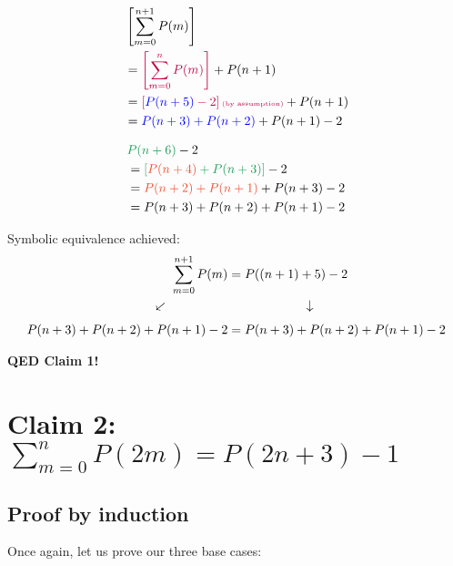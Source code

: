 \documentclass[11pt]{article}
\begin{document}
\begin{table}[h]
   \begin{subtable}[t]{0.45\textwidth}
      \begin{alignat*}{2}
         &\left[\sum_{m=0}^{n+1} P(m)\right] \\
         &=\textcolor{purple}{\left[\sum_{m=0}^{n} P(m)\right]}+P(n+1) \\
         &=\textcolor{purple}{\left[\textcolor{blue}{P(n+5)}-2\right]\text{\tiny(by assumption)}}+P(n+1) \\
         &=\textcolor{blue}{P(n+3)+P(n+2)}+P(n+1)-2
      \end{alignat*}
   \end{subtable}
   \vline
   \begin{subtable}[t]{0.45\textwidth}
      \begin{alignat*}{2}
         &\textcolor{ForestGreen}{P(n+6)}-2 \\
         &=\textcolor{ForestGreen}{\left[\textcolor{RedOrange}{P(n+4)}+P(n+3)\right]}-2 \\
         &=\textcolor{RedOrange}{P(n+2)+P(n+1)}+P(n+3)-2 \\
         &=P(n+3)+P(n+2)+P(n+1)-2
      \end{alignat*}
   \end{subtable}
\end{table}

Symbolic equivalence achieved:
\begin{align*}
   \sum_{m=0}^{n + 1} P(m) &= P((n+1)+5)-2 \\
   \rotatebox{40}{$\,\leftarrow$}\phantom{aaaaaaaaa} &\phantom{aaaaaaaaaaaa} \rotatebox{90}{$\,\leftarrow$}\\
   P(n+3)+P(n+2)+P(n+1)-2 &= P(n+3)+P(n+2)+P(n+1)-2
\end{align*}

\textbf{QED Claim 1!}

\pagebreak

\section*{Claim 2: $\displaystyle\sum_{m=0}^{n} P(2m) = P(2n+3)-1$}

\subsection*{Proof by induction}

Once again, let us prove our three base cases:
\end{document}

